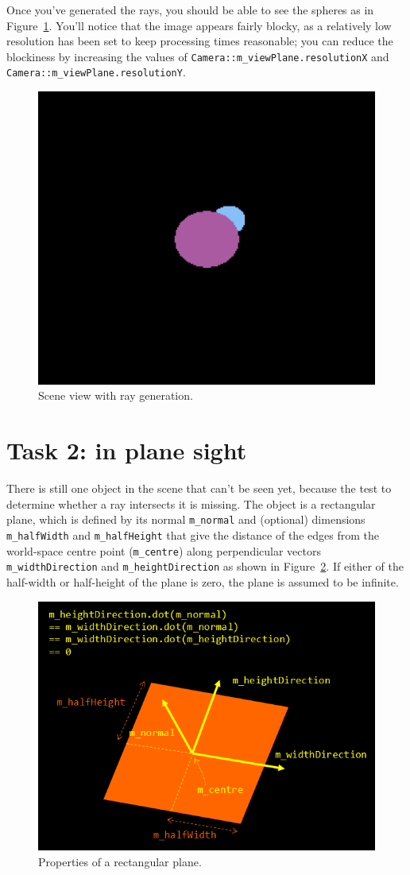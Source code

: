 \documentclass{../../../fal_assignment}
\begin{document}
Once you've generated the rays, you should be able to see the spheres as in Figure~\ref{fig:spheres}. You'll notice that the image appears fairly blocky, as a relatively low resolution has been set to keep processing times reasonable; you can reduce the blockiness by increasing the values of \lstinline{Camera::m_viewPlane.resolutionX} and \lstinline{Camera::m_viewPlane.resolutionY}.

\begin{figure}[ht]
	\begin{center}
		\includegraphics[width=0.25\linewidth]{spheres}
	\end{center}
	\caption{Scene view with ray generation.}
	\label{fig:spheres}
\end{figure}

\section*{Task 2: in plane sight}

There is still one object in the scene that can't be seen yet, because the test to determine whether a ray intersects it is missing. The object is a rectangular plane, which is defined by its normal \lstinline{m_normal} and (optional) dimensions \lstinline{m_halfWidth} and \lstinline{m_halfHeight} that give the distance of the edges from the world-space centre point (\lstinline{m_centre}) along perpendicular vectors \lstinline{m_widthDirection} and \lstinline{m_heightDirection} as shown in Figure~\ref{fig:plane_dimensions}. If either of the half-width or half-height of the plane is zero, the plane is assumed to be infinite.

\begin{figure}[ht]
	\begin{center}
		\includegraphics[width=0.5\linewidth]{plane_dimensions}
	\end{center}
	\caption{Properties of a rectangular plane.}
	\label{fig:plane_dimensions}
\end{figure}
\end{document}
